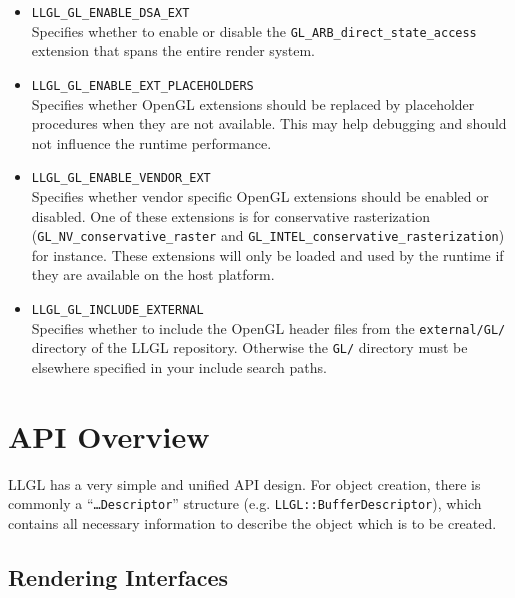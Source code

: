 \documentclass{article}
\begin{document}
\begin{itemize}
	\item \texttt{LLGL\_GL\_ENABLE\_DSA\_EXT} \\
	Specifies whether to enable or disable the \texttt{GL\_ARB\_direct\_state\_access} extension that spans the entire render system.

	\item \texttt{LLGL\_GL\_ENABLE\_EXT\_PLACEHOLDERS} \\
	Specifies whether OpenGL extensions should be replaced by placeholder procedures
	when they are not available. This may help debugging and should not influence the runtime performance.

	\item \texttt{LLGL\_GL\_ENABLE\_VENDOR\_EXT} \\
	Specifies whether vendor specific OpenGL extensions should be enabled or disabled.
	One of these extensions is for conservative rasterization
	(\texttt{GL\_NV\_conservative\_raster} and \texttt{GL\_INTEL\_conservative\_rasterization}) for instance.
	These extensions will only be loaded and used by the runtime if they are available on the host platform.

	\item \texttt{LLGL\_GL\_INCLUDE\_EXTERNAL} \\
	Specifies whether to include the OpenGL header files from the \texttt{external/GL/} directory of the LLGL repository.
	Otherwise the \texttt{GL/} directory must be elsewhere specified in your include search paths.
\end{itemize}



\clearpage
\newpage
\section{API Overview}

LLGL has a very simple and unified API design.
For object creation, there is commonly a ``\texttt{\dots Descriptor}'' structure (e.g. \texttt{LLGL::BufferDescriptor}),
which contains all necessary information to describe the object which is to be created.

\subsection{Rendering Interfaces}
\end{document}
